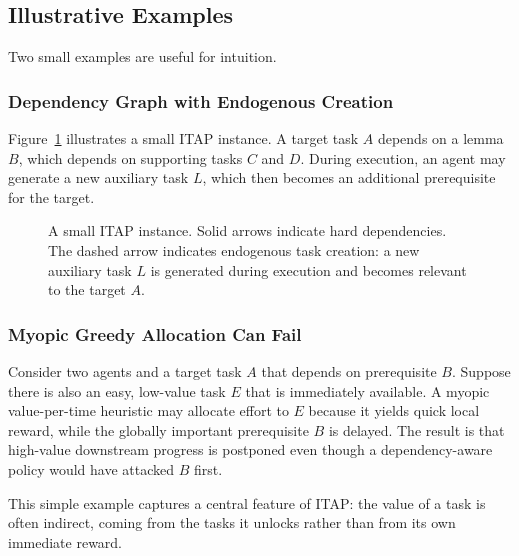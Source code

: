 \subsection{Illustrative Examples}

Two small examples are useful for intuition.

\subsubsection{Dependency Graph with Endogenous Creation}

Figure~\ref{fig:itap-small-example} illustrates a small ITAP instance. A target task \(A\) depends on a lemma \(B\), which depends on supporting tasks \(C\) and \(D\). During execution, an agent may generate a new auxiliary task \(L\), which then becomes an additional prerequisite for the target.

\begin{figure}[t]
  \centering
  \caption{A small ITAP instance. Solid arrows indicate hard dependencies. The dashed arrow indicates endogenous task creation: a new auxiliary task \(L\) is generated during execution and becomes relevant to the target \(A\).}
  \label{fig:itap-small-example}
\end{figure}

\subsubsection{Myopic Greedy Allocation Can Fail}

Consider two agents and a target task \(A\) that depends on prerequisite \(B\). Suppose there is also an easy, low-value task \(E\) that is immediately available. A myopic value-per-time heuristic may allocate effort to \(E\) because it yields quick local reward, while the globally important prerequisite \(B\) is delayed. The result is that high-value downstream progress is postponed even though a dependency-aware policy would have attacked \(B\) first.

This simple example captures a central feature of ITAP: the value of a task is often indirect, coming from the tasks it unlocks rather than from its own immediate reward.

